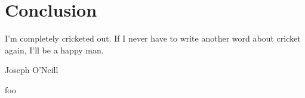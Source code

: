 \chapter{Conclusion}

\epigraph{I'm completely cricketed out. If I never have to write another word about cricket again, I'll be a happy man.}{Joseph O'Neill}

foo